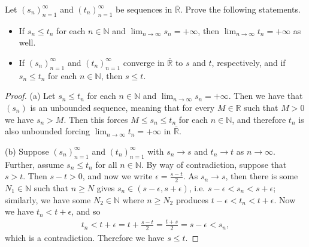 \documentclass[oneside]{amsart}
\theoremstyle{definition}
\newcommand{\rr}{\mathbb R}
\newcommand{\nn}{\mathbb N}
\begin{document}
\begin{tcolorbox}[colback=black!5!white,colframe=black!75!black,title= Exercise $4.1.$]  Let $(s_n)_{n=1}^\infty$ and $(t_n)_{n=1}^\infty$ be sequences in $\overline{\rr}$. Prove the following statements. 
\begin{itemize}
	\item [(a)] If $s_n \leq t_n$ for each $n \in \nn$ and $\lim _{n \to \infty} s_n = +\infty$, then $ \lim _{n\to \infty} t_n = + \infty$ as well.
	\item [(b)] If $(s_n)_{n=1}^\infty$ and $(t_n)_{n=1}^\infty$ converge in $\overline{\rr}$ to $s$ and $t$, respectively, and if $s_n \leq t_n$ for each $n \in \nn$, then $s \leq t$.
\end{itemize}
\tcblower 
\begin{proof} (a) Let $s_n \leq t_n$ for each $n \in \nn$ and $\lim_{n \to \infty } s_n = +\infty$. Then we have that $(s_n)$ is an unbounded sequence, meaning that for every $M\in \rr$ such that $M>0$ we have $s_n > M$. Then this forces $M \leq s_n \leq t_n$ for each $n \in \nn$, and therefore $t_n$ is also unbounded forcing $ \lim _{n\to \infty} t_n = + \infty$ in $\overline{\rr}$. 

(b) Suppose $(s_n)_{n=1}^\infty$ and $(t_n)_{n=1}^\infty$ with $s_n \to s$ and $t_n \to t$ as $n \to \infty$. Further, assume $s_n \leq t_n$ for all $n \in \nn$. By way of contradiction, suppose that $s>t$. Then $s-t> 0$, and now we write $\epsilon = \frac{s-t}{2}$. As $s_n \to s$, then there is some $N_1 \in \nn$ such that $n \geq N$ gives $s_n \in (s-\epsilon, s+\epsilon)$, i.e. $s-\epsilon < s_n < s+\epsilon$; similarly, we have some $N_2 \in \nn $ where $n \geq N_2$ produces $ t-\epsilon < t_n < t +\epsilon$. Now  we have $t_n < t+\epsilon$, and so 
\begin{align*}
	t_n < t+\epsilon = t+\frac{s-t}{2}=\frac{t+s}{2} = s-\epsilon < s_n,
\end{align*} which is a contradiction. Therefore we have $s \leq t$.
\end{proof}
\end{tcolorbox}
\end{document}
